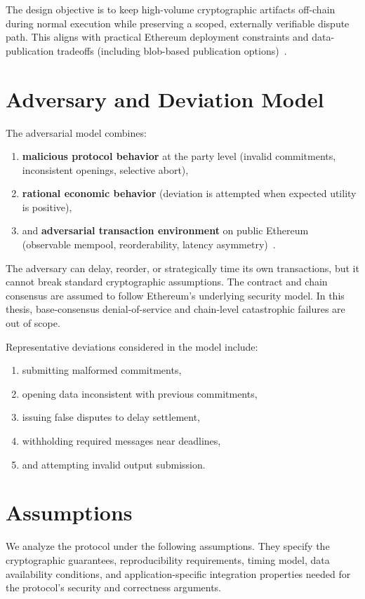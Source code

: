 \documentclass[final,twoside]{vutinfth}
\begin{document}
The design objective is to keep high-volume cryptographic artifacts off-chain
during normal execution while preserving a scoped, externally verifiable
dispute path. This aligns with practical Ethereum deployment constraints and
data-publication tradeoffs (including blob-based publication
options)~\cite{Buterin2022EIP4844}.

\section{Adversary and Deviation Model}
The adversarial model combines:
\begin{enumerate}
\item \textbf{malicious protocol behavior} at the party level (invalid commitments, inconsistent openings, selective abort),
\item \textbf{rational economic behavior} (deviation is attempted when expected utility is positive),
\item and \textbf{adversarial transaction environment} on public Ethereum (observable mempool, reorderability, latency asymmetry)~\cite{Daian2019FlashBoys}.
\end{enumerate}

The adversary can delay, reorder, or strategically time its own transactions,
but it cannot break standard cryptographic assumptions. The contract and chain
consensus are assumed to follow Ethereum's underlying security model. In this
thesis, base-consensus denial-of-service and chain-level catastrophic failures
are out of scope.

Representative deviations considered in the model include:
\begin{enumerate}
\item submitting malformed commitments,
\item opening data inconsistent with previous commitments,
\item issuing false disputes to delay settlement,
\item withholding required messages near deadlines,
\item and attempting invalid output submission.
\end{enumerate}

\section{Assumptions}
We analyze the protocol under the following assumptions. They specify the
cryptographic guarantees, reproducibility requirements, timing model, data
availability conditions, and application-specific integration properties needed
for the protocol's security and correctness arguments.
\end{document}
